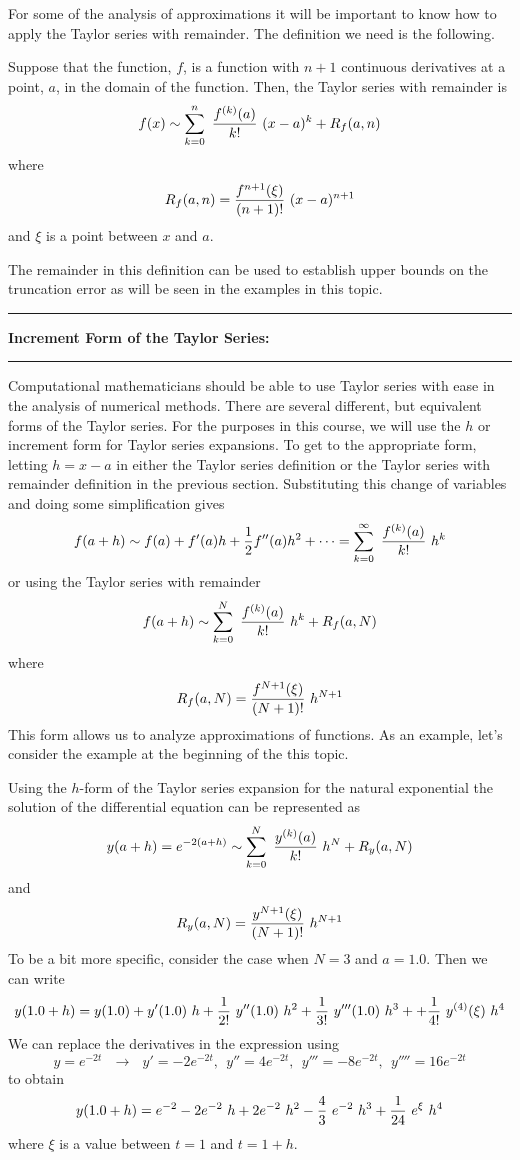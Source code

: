 \documentclass[10pt,fleqn]{article}
\begin{document}
For some of the analysis of approximations it will be important to know how to
apply the Taylor series with remainder. The definition we need is the following.
\begin{definition}
  Suppose that the function, \(f\), is a function with \(n+1\) continuous
  derivatives at a point, \(a\), in the domain of the function. Then, the Taylor
  series with remainder is
  \[
    f(x) \sim \sum_{k=0}^n\ {{f^{(k)}(a)}\over{k!}}\ ( x - a )^k
                   + R_f(a,n)
  \]
  where
  \[
    R_f(a,n) = {{f^{n+1}(\xi)}\over{(n+1)!}}\ ( x - a )^{n+1}
  \]
  and \(\xi\) is a point between \(x\) and \(a\).
\end{definition}
The remainder in this definition can be used to establish upper bounds on the
truncation error as will be seen in the examples in this topic.
\vskip0.1in\hrule\vskip0.1in\noindent
{\bf Increment Form of the Taylor Series:} 
\vskip0.1in\hrule\vskip0.1in\noindent
Computational mathematicians should be able to use Taylor series with ease in
the analysis of numerical methods. There are several different, but equivalent
forms of the Taylor series. For the purposes in this course, we will use the
\(h\) or increment form for Taylor series expansions. To get to the appropriate
form, letting \(h=x-a\) in either the Taylor series definition or the Taylor
series with remainder definition in the previous section. Substituting this
change of variables and doing some simplification gives
\[
  f(a+h) \sim f(a) + f'(a) h + {1\over 2} f''(a) h^2 + \cdots
          = \sum_{k=0}^\infty\ {{f^{(k)}(a)}\over{k!}}\ h^k
\]
or using the Taylor series with remainder
\[
    f(a+h) \sim \sum_{k=0}^N\ {{f^{(k)}(a)}\over{k!}}\ h^k
                   + R_f(a,N)
\]
where
\[
  R_f(a,N) = {{f^{N+1}(\xi)}\over{(N+1)!}}\ h^{N+1}
\]
This form allows us to analyze approximations of functions. As an example, let's
consider the example at the beginning of the this topic.

Using the \(h\)-form of the Taylor series expansion for the natural exponential
the solution of the differential equation can be represented as
\[
  y(a+h) = e^{-2(a+h)} \sim \sum_{k=0}^N\ {{y^{(k)}(a)}\over{k!}}\ h^N
                   + R_y(a,N)
\]
and
\[
  R_y(a,N) = {{y^{N+1}(\xi)}\over{(N+1)!}}\ h^{N+1}
\]
To be a bit more specific, consider the case when \(N=3\) and \(a=1.0\). Then we
can write
\[
  y(1.0+h) = y(1.0) + y'(1.0)\ h + {1\over{2!}}\ y''(1.0)\ h^2
               + {1\over{3!}}\ y'''(1.0)\ h^3 + 
               + {1\over{4!}}\ y^{(4)}(\xi)\ h^4
\]
We can replace the derivatives in the expression using
\[
   y=e^{-2t}\ \ \ \rightarrow\ \ \ 
      y'=-2e^{-2t},\ \  y''=4e^{-2t},\ \  y'''=-8e^{-2t},\ \  y''''=16e^{-2t}
\]
to obtain
\[
  y(1.0+h) = e^{-2} - 2 e^{-2}\ h + 2 e^{-2}\ h^2
               - {4\over 3}\ e^{-2} \ h^3 
               + {1\over{24}}\ e^{\xi}\ h^4
\]
where \(\xi\) is a value between \(t=1\) and \(t=1+h\).
\end{document}
